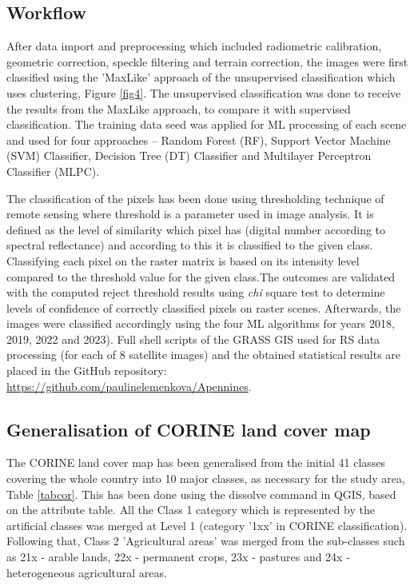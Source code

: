 \documentclass[jimaging,article,submit,pdftex,moreauthors]{Definitions/mdpi}
\begin{document}
\subsection{Workflow}

After data import and preprocessing which included radiometric calibration, geometric correction, speckle filtering and terrain correction, the images were first classified using the 'MaxLike' approach of the unsupervised classification which uses clustering, Figure \ref{fig4}. The unsupervised classification was done to receive the results from the MaxLike approach, to compare it with supervised classification. The training data seed was applied for ML processing of each scene and used for four approaches -- Random Forest (RF), Support Vector Machine (SVM) Classifier, Decision Tree (DT) Classifier and Multilayer Perceptron Classifier (MLPC). 

{The classification of the pixels has been done using thresholding technique of remote sensing where threshold is a parameter used in image analysis. It is defined as the level of similarity which pixel has (digital number according to spectral reflectance) and according to this it is classified to the given class. Classifying each pixel on the raster matrix is based on its intensity level compared to the threshold value for the given class.}The outcomes are validated with the computed reject threshold results using \emph{chi} square test to determine levels of confidence of correctly classified pixels on raster scenes. Afterwards, the images were classified accordingly {using the four ML algorithms for years} {2018}, 2019, 2022 and 2023{). }Full shell scripts of the GRASS GIS used for RS data processing (for each of 8 satellite images) and the obtained statistical results are placed in the GitHub repository: \href{https://github.com/paulinelemenkova/Apennines}{https://github.com/paulinelemenkova/Apennines}.

\subsection{{Generalisation of CORINE land cover map}}

The {CORINE land cover map} has been generalised from the initial 41 classes covering the whole country into 10 major classes, as necessary for the study area{, Table} \ref{tabcor}. {This has been done using the dissolve command in QGIS, based on the attribute table}. {All} the Class 1 category which is represented by the artificial classes was merged at Level 1 (category '1xx' in CORINE classification{)}.{ }Following that, Class 2 'Agricultural areas' was merged from the sub-classes such as 21x - arable lands, 22x - permanent crops, 23x - pastures and 24x - heterogeneous agricultural areas{.}
\end{document}
